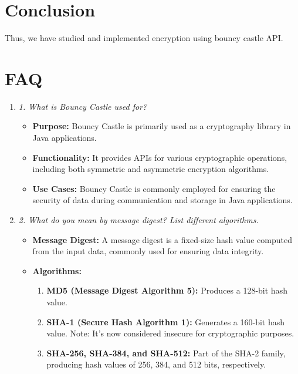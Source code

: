 \documentclass[11pt]{article}
\begin{document}
\section{Conclusion}
Thus, we have studied and implemented encryption using bouncy castle API.
\clearpage

\section{FAQ}

\begin{enumerate}
    \item \textit{1. What is Bouncy Castle used for?}
          \begin{itemize}
              \item \textbf{Purpose:} Bouncy Castle is primarily used as a cryptography library in Java applications.
              \item \textbf{Functionality:} It provides APIs for various cryptographic operations, including both symmetric and asymmetric encryption algorithms.
              \item \textbf{Use Cases:} Bouncy Castle is commonly employed for ensuring the security of data during communication and storage in Java applications.
          \end{itemize}

    \item \textit{2. What do you mean by message digest? List different algorithms.}
          \begin{itemize}
              \item \textbf{Message Digest:} A message digest is a fixed-size hash value computed from the input data, commonly used for ensuring data integrity.
              \item \textbf{Algorithms:}
                    \begin{enumerate}
                        \item \textbf{MD5 (Message Digest Algorithm 5):} Produces a 128-bit hash value.
                        \item \textbf{SHA-1 (Secure Hash Algorithm 1):} Generates a 160-bit hash value. Note: It's now considered insecure for cryptographic purposes.
                        \item \textbf{SHA-256, SHA-384, and SHA-512:} Part of the SHA-2 family, producing hash values of 256, 384, and 512 bits, respectively.
                    \end{enumerate}
          \end{itemize}


\end{enumerate}
\end{document}
